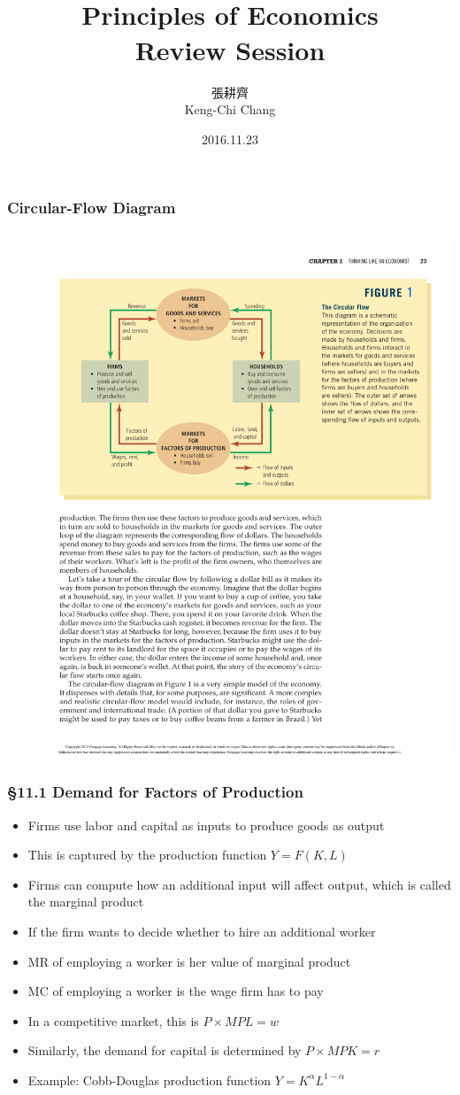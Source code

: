 \documentclass[12pt, xcolor=dvipsnames]{beamer}
\title{\bf{\Huge {}\\[-2mm] Principles of Economics \\[2mm] Review Session}}
\author{{\Large 張耕齊\\[2mm] Keng-Chi Chang}}
\institute{{}\\[-7mm]\footnotesize\tt{<r03323070@ntu.edu.tw>}\\[2mm]}
\date{\large 2016.11.23}
\begin{document}
\fontsize{12}{14pt}\selectfont

\begin{frame}
\titlepage
\end{frame}


\begin{frame}
\frametitle{\bf Circular-Flow Diagram}
\begin{center}
\includegraphics[height=.85\textheight]{figures/circular-flow.pdf}
\end{center}
\end{frame}



\begin{frame}
\frametitle{\bf §11.1 Demand for Factors of Production}
\begin{itemize}
\item Firms use labor and capital as inputs to produce goods as output
\item This is captured by the production function $Y=F(K,L)$
\item Firms can compute how an additional input will affect output, which is called the marginal product
\item If the firm wants to decide whether to hire an additional worker
\item MR of employing a worker is her value of marginal product
\item MC of employing a worker is the wage firm has to pay
\item In a competitive market, this is $P\times MPL=w$
\item Similarly, the demand for capital is determined by $P\times MPK=r$
\item Example: Cobb-Douglas production function $Y=K^\alpha L^{1-\alpha}$
\end{itemize}
\end{frame}
\end{document}
